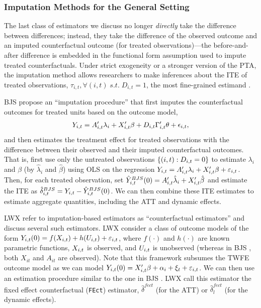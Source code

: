 \documentclass[12pt]{article}
\begin{document}
\subsubsection{Imputation Methods for the General Setting}

The last class of estimators we discuss no longer \textit{directly} take the difference between differences; instead, they take the difference of the observed outcome and an imputed counterfactual outcome (for treated observations)---the before-and-after difference is embedded in the functional form assumption used to impute treated counterfactuals. Under strict exogeneity or a stronger version of the PTA, the imputation method allows researchers to make inferences about the ITE of treated observations, $\tau_{i,t}, \forall (i,t) \;s.t.\; D_{i,t}=1$, the most fine-grained estimand  \citep[e.g.,][]{Bai2020-tr}.


BJS \citeyearpar{BJS2021} propose an ``imputation procedure'' that first imputes the counterfactual outcomes for treated units based on the outcome model,
\vspace{-1em}\begin{align*}
    Y_{i,t}=A_{i,t}'\lambda_i + X_{i,t}'\beta + D_{i,t}\Gamma_{i,t}'\theta +\epsilon_{i,t},\vspace{-1em}
\end{align*}
and then estimates the treatment effect for treated observations with the difference between their observed and their imputed counterfactual outcomes. That is, first use only the untreated observations $\{(i,t) : D_{i,t}=0\}$ to estimate $\lambda_i$ and $\beta$ (by $\hat\lambda_i$ and $\hat\beta$) using OLS on the regression $Y_{i,t}=A_{i,t}'\lambda_i + X_{i,t}'\beta  +\varepsilon_{i,t}$. Then, for each treated observation, set $ \hat{Y}_{i,t}^{BJS}(0)=A_{i,t}'\hat\lambda_i + X_{i,t}'\hat\beta$ and estimate the ITE as $\hat\delta^{BJS}_{i,t}=Y_{i,t}-\hat{Y}_{i,t}^{BJS}(0)$. We can then combine these ITE estimates to estimate aggregate quantities, including the ATT and dynamic effects. 

LWX \citeyearpar{LWX2022} refer to imputation-based estimators as ``counterfactual estimators'' and discuss several such estimators. LWX \citeyearpar{LWX2022} consider a class of outcome models of the form $Y_{i,t}(0)=f(X_{i,t})+h(U_{i,t})+\varepsilon_{i,t}$, where $f(\cdot)$ and $h(\cdot)$ are known parametric functions, $X_{i,t}$ is observed, and $U_{i,t}$ is unobserved (whereas in BJS \citeyearpar{BJS2021}, both $X_{it}$ and $A_{it}$ are observed). Note that this framework subsumes the TWFE outcome model as we can model $Y_{i,t}(0)=X_{i,t}'\beta + \alpha_i + \xi_t + \varepsilon_{i,t}$. We can then use an estimation procedure similar to the one in BJS \citeyearpar{BJS2021}. LWX \citeyearpar{LWX2022} call this estimator the fixed effect counterfactual (\texttt{FEct}) estimator, $\hat\delta^{fect}$ (for the ATT) or $\hat\delta^{fect}_{l}$ (for the dynamic effects). 
\end{document}
